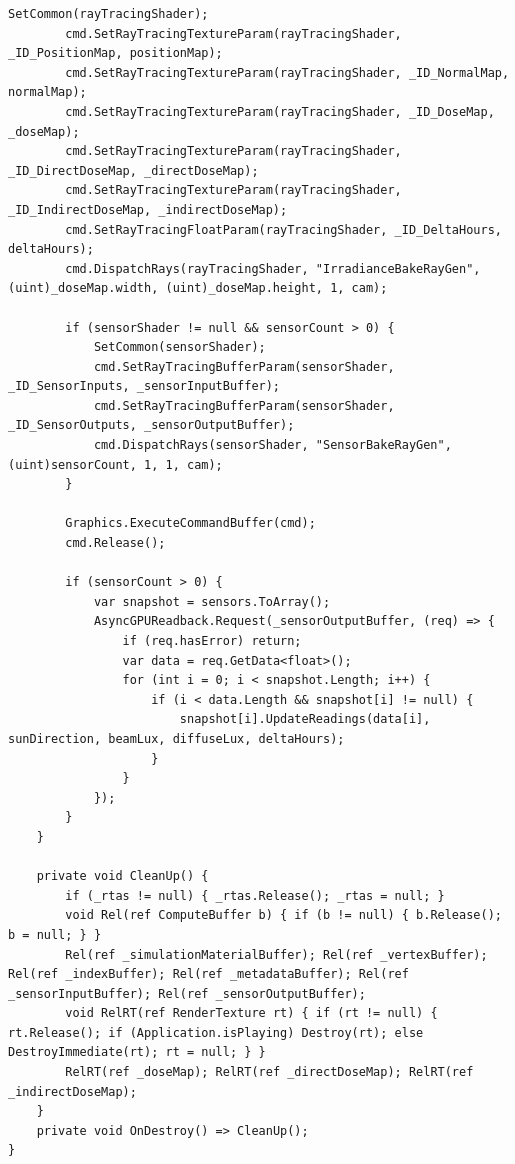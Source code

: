 \begin{lstlisting}[language={[Sharp]C}, caption={IrradianceBaker.cs: Orchestrates the hardware-accelerated DXR raytracing passes.}, label={lst:irradiancebaker}]
        SetCommon(rayTracingShader);
        cmd.SetRayTracingTextureParam(rayTracingShader, _ID_PositionMap, positionMap);
        cmd.SetRayTracingTextureParam(rayTracingShader, _ID_NormalMap, normalMap);
        cmd.SetRayTracingTextureParam(rayTracingShader, _ID_DoseMap, _doseMap);
        cmd.SetRayTracingTextureParam(rayTracingShader, _ID_DirectDoseMap, _directDoseMap);
        cmd.SetRayTracingTextureParam(rayTracingShader, _ID_IndirectDoseMap, _indirectDoseMap);
        cmd.SetRayTracingFloatParam(rayTracingShader, _ID_DeltaHours, deltaHours);
        cmd.DispatchRays(rayTracingShader, "IrradianceBakeRayGen", (uint)_doseMap.width, (uint)_doseMap.height, 1, cam);

        if (sensorShader != null && sensorCount > 0) {
            SetCommon(sensorShader);
            cmd.SetRayTracingBufferParam(sensorShader, _ID_SensorInputs, _sensorInputBuffer);
            cmd.SetRayTracingBufferParam(sensorShader, _ID_SensorOutputs, _sensorOutputBuffer);
            cmd.DispatchRays(sensorShader, "SensorBakeRayGen", (uint)sensorCount, 1, 1, cam);
        }

        Graphics.ExecuteCommandBuffer(cmd);
        cmd.Release();

        if (sensorCount > 0) {
            var snapshot = sensors.ToArray();
            AsyncGPUReadback.Request(_sensorOutputBuffer, (req) => {
                if (req.hasError) return;
                var data = req.GetData<float>();
                for (int i = 0; i < snapshot.Length; i++) {
                    if (i < data.Length && snapshot[i] != null) {
                        snapshot[i].UpdateReadings(data[i], sunDirection, beamLux, diffuseLux, deltaHours);
                    }
                }
            });
        }
    }

    private void CleanUp() {
        if (_rtas != null) { _rtas.Release(); _rtas = null; }
        void Rel(ref ComputeBuffer b) { if (b != null) { b.Release(); b = null; } }
        Rel(ref _simulationMaterialBuffer); Rel(ref _vertexBuffer); Rel(ref _indexBuffer); Rel(ref _metadataBuffer); Rel(ref _sensorInputBuffer); Rel(ref _sensorOutputBuffer);
        void RelRT(ref RenderTexture rt) { if (rt != null) { rt.Release(); if (Application.isPlaying) Destroy(rt); else DestroyImmediate(rt); rt = null; } }
        RelRT(ref _doseMap); RelRT(ref _directDoseMap); RelRT(ref _indirectDoseMap);
    }
    private void OnDestroy() => CleanUp();
}
\end{lstlisting}

